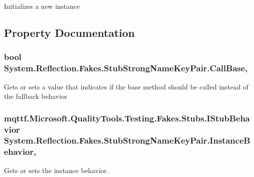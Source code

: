 Initializes a new instance



\subsection{Property Documentation}
\hypertarget{class_system_1_1_reflection_1_1_fakes_1_1_stub_strong_name_key_pair_aa5901a0d96f9ec871c9bfde639e3058f}{
\subsubsection[{Call\-Base}]{\setlength{\rightskip}{0pt plus 5cm}bool System.\-Reflection.\-Fakes.\-Stub\-Strong\-Name\-Key\-Pair.\-Call\-Base\hspace{0.3cm}{\ttfamily [get]}, {\ttfamily [set]}}}\label{class_system_1_1_reflection_1_1_fakes_1_1_stub_strong_name_key_pair_aa5901a0d96f9ec871c9bfde639e3058f}


Gets or sets a value that indicates if the base method should be called instead of the fallback behavior

\hypertarget{class_system_1_1_reflection_1_1_fakes_1_1_stub_strong_name_key_pair_ac6d39ae6d5635924076c4755a2fe3ac7}{
\subsubsection[{Instance\-Behavior}]{\setlength{\rightskip}{0pt plus 5cm}mqttf.\-Microsoft.\-Quality\-Tools.\-Testing.\-Fakes.\-Stubs.\-I\-Stub\-Behavior System.\-Reflection.\-Fakes.\-Stub\-Strong\-Name\-Key\-Pair.\-Instance\-Behavior\hspace{0.3cm}{\ttfamily [get]}, {\ttfamily [set]}}}\label{class_system_1_1_reflection_1_1_fakes_1_1_stub_strong_name_key_pair_ac6d39ae6d5635924076c4755a2fe3ac7}


Gets or sets the instance behavior.

